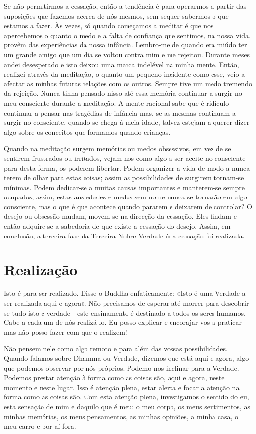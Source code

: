Se não permitirmos a cessação, então a tendência é para operarmos a partir das
suposições que fazemos acerca de nós mesmos, sem sequer sabermos o que estamos a
fazer. Às vezes, só quando começamos a meditar é que nos apercebemos o quanto o
medo e a falta de confiança que sentimos, na nossa vida, provêm das experiências
da nossa infância. Lembro-me de quando era miúdo ter um grande amigo que um dia
se voltou contra mim e me rejeitou. Durante meses andei desesperado e isto
deixou uma marca indelével na minha mente. Então, realizei através da meditação,
o quanto um pequeno incidente como esse, veio a afectar as minhas futuras
relações com os outros. Sempre tive um medo tremendo da rejeição. Nunca tinha
pensado nisso até essa memória continuar a surgir no meu consciente durante a
meditação. A mente racional sabe que é ridículo continuar a pensar nas tragédias
de infância mas, se as mesmas continuam a surgir no consciente, quando se chega
à meia-idade, talvez estejam a querer dizer algo sobre os conceitos que formamos
quando crianças.

Quando na meditação surgem memórias ou medos obsessivos, em vez de se sentirem
frustrados ou irritados, vejam-nos como algo a ser aceite no consciente para
desta forma, os poderem libertar. Podem organizar a vida de modo a nunca terem
de olhar para estas coisas; assim as possibilidades de surgirem tornam-se
mínimas. Podem dedicar-se a muitas causas importantes e manterem-se sempre
ocupados; assim, estas ansiedades e medos sem nome nunca se tornarão em algo
consciente, mas o que é que acontece quando pararem e deixarem de controlar? O
desejo ou obsessão mudam, movem-se na direcção da cessação. Eles findam e então
adquire-se a sabedoria de que existe a cessação do desejo. Assim, em conclusão,
a terceira fase da Terceira Nobre Verdade é: a cessação foi realizada.

\section{Realização}

Isto é para ser realizado. Disse o Buddha enfaticamente: «Isto é uma Verdade a
ser realizada aqui e agora». Não precisamos de esperar até morrer para descobrir
se tudo isto é verdade - este ensinamento é destinado a todos os seres humanos.
Cabe a cada um de nós realizá-lo. Eu posso explicar e encorajar-vos a praticar
mas não posso fazer com que o realizem!

Não pensem nele como algo remoto e para além das vossas possibilidades. Quando
falamos sobre Dhamma ou Verdade, dizemos que está aqui e agora, algo que podemos
observar por nós próprios. Podemo-nos inclinar para a Verdade. Podemos prestar
atenção à forma como as coisas são, aqui e agora, neste momento e neste lugar.
Isso é atenção plena, estar alerta e focar a atenção na forma como as coisas
são. Com esta atenção plena, investigamos o sentido do eu, esta sensação de mim
e daquilo que é meu: o meu corpo, os meus sentimentos, as minhas memórias, os
meus pensamentos, as minhas opiniões, a minha casa, o meu carro e por aí fora.

